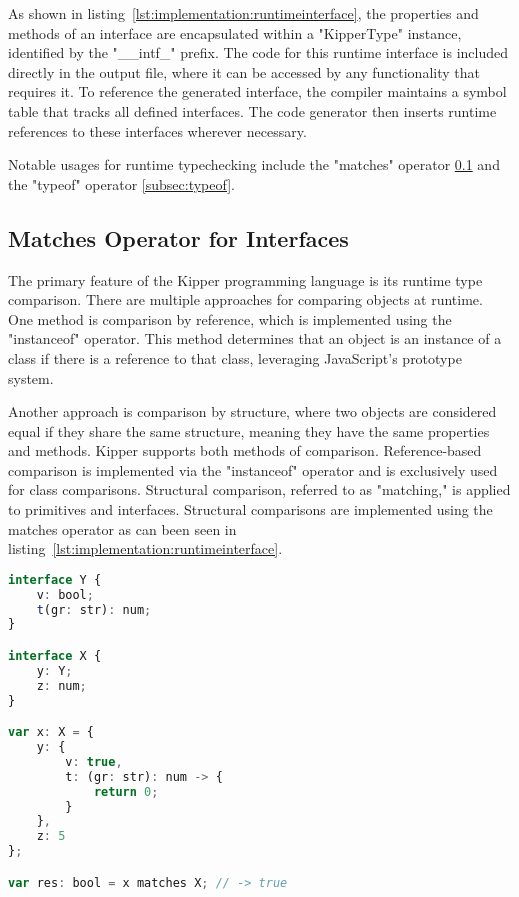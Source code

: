 As shown in listing~\ref{lst:implementation:runtimeinterface}, the properties and methods of an interface are encapsulated within a "KipperType" instance, identified by the "\_\_intf\_" prefix. The code for this runtime interface is included directly in the output file, where it can be accessed by any functionality that requires it. To reference the generated interface, the compiler maintains a symbol table that tracks all defined interfaces. The code generator then inserts runtime references to these interfaces wherever necessary.

Notable usages for runtime typechecking include the "matches" operator \ref{subsec:matches} and the "typeof" operator \ref{subsec:typeof}.

\subsection{Matches Operator for Interfaces}
\label{subsec:matches}

The primary feature of the Kipper programming language is its runtime type comparison. There are multiple approaches for comparing objects at runtime. One method is comparison by reference, which is implemented using the "instanceof" operator. This method determines that an object is an instance of a class if there is a reference to that class, leveraging JavaScript's prototype system.

Another approach is comparison by structure, where two objects are considered equal if they share the same structure, meaning they have the same properties and methods. Kipper supports both methods of comparison. Reference-based comparison is implemented via the "instanceof" operator and is exclusively used for class comparisons. Structural comparison, referred to as "matching," is applied to primitives and interfaces. Structural comparisons are implemented using the matches operator as can been seen in listing~\ref{lst:implementation:runtimeinterface}.

\begin{lstlisting}[language=Typescript,caption=The Kipper matches operator,label=lst:implementation:matchesoperator]
interface Y {
	v: bool;
	t(gr: str): num;
}

interface X {
	y: Y;
	z: num;
}

var x: X = {
	y: {
		v: true,
		t: (gr: str): num -> {
			return 0;
		}
	},
	z: 5
};

var res: bool = x matches X; // -> true
\end{lstlisting}

